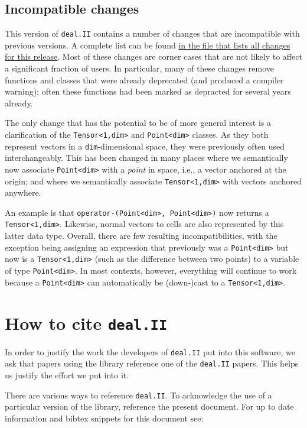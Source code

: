 \documentclass{ansarticle-preprint}
\newcommand{\specialword}[1]{\texttt{#1}}
\newcommand{\dealii}{{\specialword{deal.II}}}
\begin{document}
\subsection{Incompatible changes}

This version of \dealii{} contains a number of changes that are
incompatible with previous versions. A complete list can be found
\href{https://www.dealii.org/8.3.0/doxygen/deal.II/changes_between_8_2_1_and_8_3.html}{in
  the file that lists all changes for this release}. Most of these
changes are corner cases that are not likely to affect a
significant fraction of users. In particular, many of these changes
remove functions and classes that were already deprecated (and
produced a compiler warning); often these functions had been marked as
depracted for several years already.

The only change that has the potential to be of more general interest
is a clarification of the \texttt{Tensor<1,dim>} and
\texttt{Point<dim>} classes. As they both represent vectors in a
\texttt{dim}-dimensional space, they were previously often used
interchangeably. This has been changed in many places where we
semantically now associate \texttt{Point<dim>} with a \textit{point}
in space, i.e., a vector anchored at the origin; and where we
semantically associate \texttt{Tensor<1,dim>} with vectors anchored
anywhere.

An example is that \texttt{operator-(Point<dim>, Point<dim>)} now
returns a \texttt{Tensor<1,dim>}. Likewise, normal vectors to cells
are also represented by this latter data type. Overall, there are few
resulting incompatibilities, with the exception being assigning an
expression that previously was a \texttt{Point<dim>} but now is a
\texttt{Tensor<1,dim>} (such as the difference between two points) to
a variable of type \texttt{Point<dim>}. In most contexts, however,
everything will continue to work because a \texttt{Point<dim>} can
automatically be (down-)cast to a \texttt{Tensor<1,dim>}.


\section{How to cite \dealii{}}\label{sec:cite}

In order to justify the work the developers of \dealii{} put into this
software, we ask that papers using the library reference one of the
\dealii{} papers. This helps us justify the effort we put into it.

There are various ways to reference \dealii{}. To acknowledge the use of a
particular version of the library, reference the present document. For up
to date information and bibtex snippets for this document see:
\end{document}
